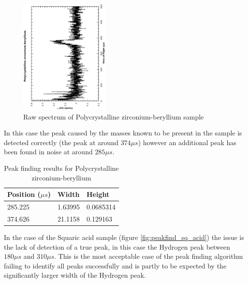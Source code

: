 \documentclass[a4paper]{article}
\begin{document}
\begin{figure}[h!]
  \centering
  \begin{turn}{-90}
    \includegraphics[width=0.4\textwidth]{graphics/peakfind_pczrbe.eps}
  \end{turn}
  \caption{Raw spectrum of Polycrystalline zirconium-beryllium sample}
  \label{fig:peakfind_pczrbe}
\end{figure}
\FloatBarrier

In this case the peak caused by the masses known to be present in the sample is
detected correctly (the peak at around $374 \mu s$) however an additional peak has
been found in noise at around $285 \mu s$.

\begin{table}[h!]
  \centering
  \begin{tabular}{@{}lll@{}}
    \toprule
    Position ($\mu s$) & Width   & Height    \\
    \midrule
    285.225            & 1.63995 & 0.0685314 \\
    374.626            & 21.1158 & 0.129163  \\
    \bottomrule
  \end{tabular}
  \caption{Peak finding results for Polycrystalline zirconium-beryllium}
  \label{tab:peakfind_pczrbe}
\end{table}
\FloatBarrier

In the case of the Squaric acid sample (figure \ref{fig:peakfind_sq_acid}) the
issue is the lack of detection of a true peak, in this case the Hydrogen peak
between $180 \mu s$ and $310 \mu s$. This is the most acceptable case of the
peak finding algorithm failing to identify all peaks successfully and is partly
to be expected by the significantly larger width of the Hydrogen peak.
\end{document}
